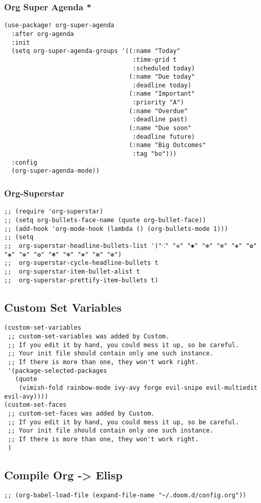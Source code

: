 \documentclass[11pt]{article}
\begin{document}
\subsubsection{Org Super Agenda *}
\label{sec:org30c756c}
\begin{verbatim}
(use-package! org-super-agenda
  :after org-agenda
  :init
  (setq org-super-agenda-groups '((:name "Today"
                                   :time-grid t
                                   :scheduled today)
                                  (:name "Due today"
                                   :deadline today)
                                  (:name "Important"
                                   :priority "A")
                                  (:name "Overdue"
                                   :deadline past)
                                  (:name "Due soon"
                                   :deadline future)
                                  (:name "Big Outcomes"
                                   :tag "bo")))
  :config
  (org-super-agenda-mode))
\end{verbatim}
\subsubsection{Org-Superstar}
\label{sec:orgb84fb1d}
\begin{verbatim}
;; (require 'org-superstar)
;; (setq org-bullets-face-name (quote org-bullet-face))
;; (add-hook 'org-mode-hook (lambda () (org-bullets-mode 1)))
;; (setq
;;  org-superstar-headline-bullets-list '("⁖" "✲" "✱" "✻" "✼" "✥" "✿" "❀" "❁" "❂" "❃" "❄" "❅" "❆" "❇")
;;  org-superstar-cycle-headline-bullets t
;;  org-superstar-item-bullet-alist t
;;  org-superstar-prettify-item-bullets t)
\end{verbatim}
\subsection{Custom Set Variables}
\label{sec:orgbffa7f5}
\begin{verbatim}
(custom-set-variables
 ;; custom-set-variables was added by Custom.
 ;; If you edit it by hand, you could mess it up, so be careful.
 ;; Your init file should contain only one such instance.
 ;; If there is more than one, they won't work right.
 '(package-selected-packages
   (quote
    (vimish-fold rainbow-mode ivy-avy forge evil-snipe evil-multiedit evil-avy))))
(custom-set-faces
 ;; custom-set-faces was added by Custom.
 ;; If you edit it by hand, you could mess it up, so be careful.
 ;; Your init file should contain only one such instance.
 ;; If there is more than one, they won't work right.
 )
\end{verbatim}
\subsection{Compile Org -> Elisp}
\label{sec:org7df7858}
\begin{verbatim}
;; (org-babel-load-file (expand-file-name "~/.doom.d/config.org"))
\end{verbatim}
\end{document}
